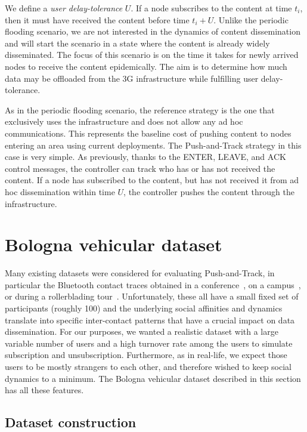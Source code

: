 \documentclass[preprint]{elsarticle}
\begin{document}
We define a \emph{user delay-tolerance} $U$. If a node subscribes to the content at time $t_i$, then it must have received the content before time $t_i + U$. Unlike the periodic flooding scenario, we are not interested in the dynamics of content dissemination and will start the scenario in a state where the content is already widely disseminated. The focus of this scenario is on the time it takes for newly arrived nodes to receive the content epidemically. The aim is to determine how much data may be offloaded from the 3G infrastructure while fulfilling user delay-tolerance.

As in the periodic flooding scenario, the reference strategy is the one that exclusively uses the infrastructure and does not allow any ad hoc communications. This represents the baseline cost of pushing content to nodes entering an area using current deployments. The Push-and-Track strategy in this case is very simple. As previously, thanks to the \textsf{ENTER}, \textsf{LEAVE}, and \textsf{ACK} control messages, the controller can track who has or has not received the content. If a node has subscribed to the content, but has not received it from ad hoc dissemination within time $U$, the controller pushes the content through the infrastructure.


\section{Bologna vehicular dataset}
\label{sec:dataset}

Many existing datasets were considered for evaluating Push-and-Track, in particular the Bluetooth contact traces obtained in a conference~\cite{chaintreau}, on a campus~\cite{mit}, or during a rollerblading tour~\cite{tournoux08}. Unfortunately, these all have a small fixed set of participants (roughly 100) and the underlying social affinities and dynamics translate into specific inter-contact patterns that have a crucial impact on data dissemination. For our purposes, we wanted a realistic dataset with a large variable number of users and a high turnover rate among the users to simulate subscription and unsubscription. Furthermore, as in real-life, we expect those users to be mostly strangers to each other, and therefore wished to keep social dynamics to a minimum. The Bologna vehicular dataset described in this section has all these features.

\subsection{Dataset construction}
\label{subsec:dataset_construction}
\end{document}

